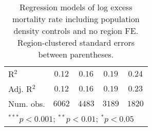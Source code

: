 \begin{table}
\begin{center}
\begin{tabular}{l c c c c}
\hline
R$^2$                & $0.12$        & $0.16$        & $0.19$        & $0.24$        \\
Adj. R$^2$           & $0.12$        & $0.16$        & $0.19$        & $0.23$        \\
Num. obs.            & $6062$        & $4483$        & $3189$        & $1820$        \\
\hline
\multicolumn{5}{l}{\scriptsize{$^{***}p<0.001$; $^{**}p<0.01$; $^{*}p<0.05$}}
\end{tabular}
\caption{Regression models of log excess mortality rate including population density controls and no region FE. Region-clustered standard errors between parentheses.}
\label{tab:popdensmodels}
\end{center}
\end{table}
